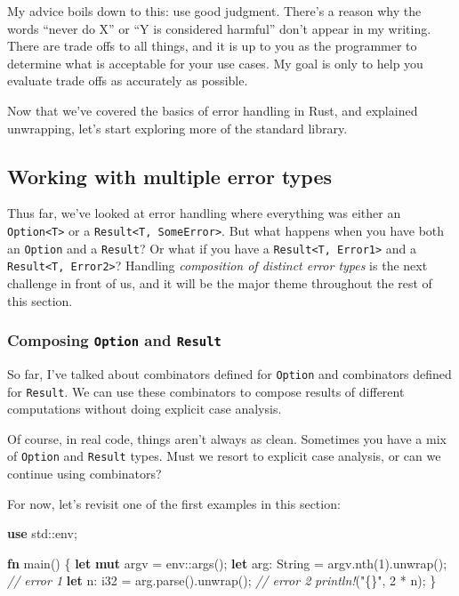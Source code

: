 \documentclass[a4paper,]{book}
\newenvironment{Shaded}{\begin{snugshade}}{\end{snugshade}}
\newcommand{\KeywordTok}[1]{\textcolor[rgb]{0.13,0.29,0.53}{\textbf{{#1}}}}
\newcommand{\DataTypeTok}[1]{\textcolor[rgb]{0.13,0.29,0.53}{{#1}}}
\newcommand{\DecValTok}[1]{\textcolor[rgb]{0.00,0.00,0.81}{{#1}}}
\newcommand{\StringTok}[1]{\textcolor[rgb]{0.31,0.60,0.02}{{#1}}}
\newcommand{\CommentTok}[1]{\textcolor[rgb]{0.56,0.35,0.01}{\textit{{#1}}}}
\newcommand{\PreprocessorTok}[1]{\textcolor[rgb]{0.56,0.35,0.01}{\textit{{#1}}}}
\newcommand{\NormalTok}[1]{{#1}}
\begin{document}
My advice boils down to this: use good judgment. There's a reason why
the words ``never do X'' or ``Y is considered harmful'' don't appear in
my writing. There are trade offs to all things, and it is up to you as
the programmer to determine what is acceptable for your use cases. My
goal is only to help you evaluate trade offs as accurately as possible.

Now that we've covered the basics of error handling in Rust, and
explained unwrapping, let's start exploring more of the standard
library.

\hypertarget{working-with-multiple-error-types}{\subsection{Working with
multiple error types}\label{working-with-multiple-error-types}}

Thus far, we've looked at error handling where everything was either an
\texttt{Option\textless{}T\textgreater{}} or a
\texttt{Result\textless{}T,\ SomeError\textgreater{}}. But what happens
when you have both an \texttt{Option} and a \texttt{Result}? Or what if
you have a \texttt{Result\textless{}T,\ Error1\textgreater{}} and a
\texttt{Result\textless{}T,\ Error2\textgreater{}}? Handling
\emph{composition of distinct error types} is the next challenge in
front of us, and it will be the major theme throughout the rest of this
section.

\hypertarget{composing-option-and-result}{\subsubsection{\texorpdfstring{Composing
\texttt{Option} and
\texttt{Result}}{Composing Option and Result}}\label{composing-option-and-result}}

So far, I've talked about combinators defined for \texttt{Option} and
combinators defined for \texttt{Result}. We can use these combinators to
compose results of different computations without doing explicit case
analysis.

Of course, in real code, things aren't always as clean. Sometimes you
have a mix of \texttt{Option} and \texttt{Result} types. Must we resort
to explicit case analysis, or can we continue using combinators?

For now, let's revisit one of the first examples in this section:

\begin{Shaded}
\begin{Highlighting}[]
\KeywordTok{use} \NormalTok{std::env;}

\KeywordTok{fn} \NormalTok{main() \{}
    \KeywordTok{let} \KeywordTok{mut} \NormalTok{argv = env::args();}
    \KeywordTok{let} \NormalTok{arg: }\DataTypeTok{String} \NormalTok{= argv.nth(}\DecValTok{1}\NormalTok{).unwrap(); }\CommentTok{// error 1}
    \KeywordTok{let} \NormalTok{n: }\DataTypeTok{i32} \NormalTok{= arg.parse().unwrap(); }\CommentTok{// error 2}
    \PreprocessorTok{println!}\NormalTok{(}\StringTok{"\{\}"}\NormalTok{, }\DecValTok{2} \NormalTok{* n);}
\NormalTok{\}}
\end{Highlighting}
\end{Shaded}
\end{document}
